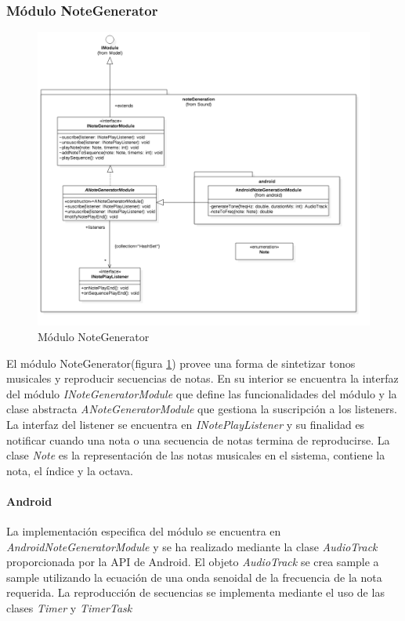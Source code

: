 \subsubsection{Módulo NoteGenerator}
\begin{figure}
	\centering
	\includegraphics[width=1\linewidth]{imagenes/diagramas/NoteGenerationModule.png}
	\caption{Módulo NoteGenerator}
	\label{fig:note-generator-module}
\end{figure}
El módulo NoteGenerator(figura \ref{fig:note-generator-module}) provee una forma de sintetizar tonos musicales y reproducir secuencias de notas.
En su interior se encuentra la interfaz del módulo \textit{INoteGeneratorModule} que define las funcionalidades del módulo y la clase abstracta \textit{ANoteGeneratorModule} que gestiona la suscripción a los listeners. La interfaz del listener se encuentra en \textit{INotePlayListener} y su finalidad es notificar cuando una nota o una secuencia de notas termina de reproducirse. La clase \textit{Note} es la representación de las notas musicales en el sistema, contiene la nota, el índice y la octava.

\paragraph*{Android\\}

La implementación especifica del módulo se encuentra en \textit{AndroidNoteGeneratorModule} y se ha realizado mediante la clase \textit{AudioTrack} proporcionada por la API de Android. El objeto \textit{AudioTrack} se crea sample a sample utilizando la ecuación de una onda senoidal de la frecuencia de la nota requerida. La reproducción de secuencias se implementa mediante el uso de las clases \textit{Timer} y \textit{TimerTask}

